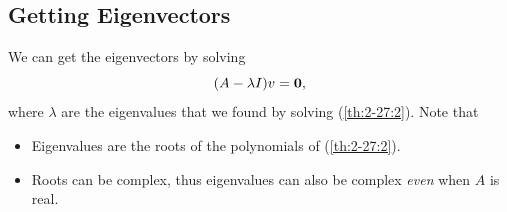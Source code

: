 \documentclass[letterpaper]{article}
\newcommand{\0}{\mathbf{0}}
\begin{document}
\subsection{Getting Eigenvectors}
We can get the eigenvectors by solving \begin{equation}{\label{eq:2-27:3}}
    (A - \lambda I)v = \0,
\end{equation}
where $\lambda$ are the eigenvalues that we found by solving (\ref{th:2-27:2}). Note that 
\begin{itemize}
    \item Eigenvalues are the roots of the polynomials of (\ref{th:2-27:2}).
    \item Roots can be complex, thus eigenvalues can also be complex \emph{even} when $A$ is real. 
\end{itemize}
\end{document}
